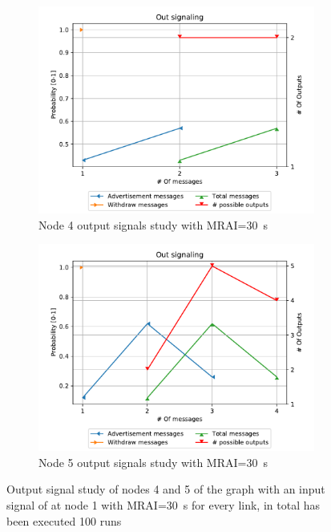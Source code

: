 \begin{figure}[h]
     \centering
     \begin{subfigure}[b]{0.49\textwidth}
         \centering
         \includegraphics[width=\textwidth]{images/signal_study/fig_4_MRAI/fig_4_4_signaling_nmessage_prob.pdf}
		 \caption{Node \num{4} output signals study with \ac{MRAI}=\SI{30}{\second}}
         \label{fig:signal_node4_MRAI}
     \end{subfigure}
     \hfill
     \begin{subfigure}[b]{0.49\textwidth}
         \centering
         \includegraphics[width=\textwidth]{images/signal_study/fig_4_MRAI/fig_4_5_signaling_nmessage_prob.pdf}
		 \caption{Node \num{5} output signals study with \ac{MRAI}=\SI{30}{\second}}
         \label{fig:signal_node5_MRAI}
     \end{subfigure}
		\caption{Output signal study of nodes \num{4} and \num{5} of the graph
			 with an input signal of  at node \num{1}
			with \ac{MRAI}=\SI{30}{\second} for every link, in total has been
			executed \num{100} runs}
        \label{fig:signal_griffin_fig4_MRAI}
\end{figure}

